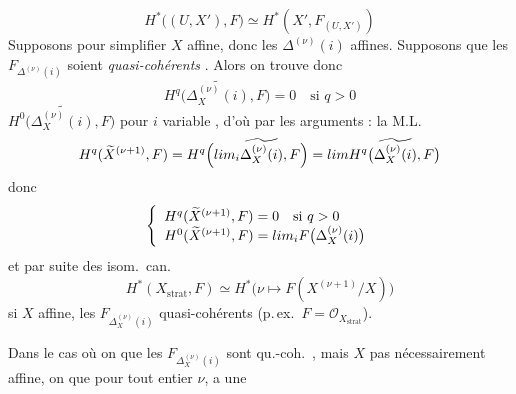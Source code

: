 \documentclass[11pt,a4paper]{article}
\begin{document}
\[
  H^{*}\bigl((U, X'), F\bigr) \simeq H^{*}(X', F_{(U, X')})
\]
Supposons pour simplifier $X$ affine,  donc
les $\Delta^{(\nu)}(i)$ affines. Supposons que les $F_{\Delta^{(\nu)}(i)}$
soient \emph{quasi-cohérents} . Alors on trouve donc
\[
  H^{q}\bigl(\widetilde{\Delta^{(\nu)}_X(i)}, F\bigr) = 0
  \quad \text{si } q > 0
\]
$H^{0}\bigl(\widetilde{\Delta^{(\nu)}_X(i)}, F\bigr)$ pour $i$ variable
, d'où par les arguments : la
M.L.
\[
  H^{q}(\widetilde{X}^{(\nu+1)}, F) =
  H^{q}\Bigl(\varinjlim_{i} \widetilde{\Delta^{(\nu)}_X(i)}, F\Bigr) =
  \varprojlim H^{q}\bigl(\widetilde{\Delta^{(\nu)}_X(i)}, F\bigr)
\]
donc
\[
  \left\lbrace
  \begin{array}{l}
    H^{q}(\widetilde{X}^{(\nu+1)}, F) = 0 \quad \text{si } q > 0 \\
    H^{0}(\widetilde{X}^{(\nu+1)}, F) = \varprojlim_{i}
    F\bigl(\Delta^{(\nu)}_X(i)\bigr)
  \end{array}
  \right.
\]
et par suite des isom.\ can.
\[
  \boxed{\;H^{*}(X_{\mathrm{strat}}, F) \simeq
  H^{*}\bigl(\nu \mapsto F(X^{(\nu+1)}/X)\bigr)\;}
\]
si $X$ affine, les $F_{\Delta^{(\nu)}_X(i)}$ quasi-cohérents
(p.\,ex.\ $F = \mathcal{O}_{X_{\mathrm{strat}}}$).

Dans le cas où on \struck{\ill{}} 
 que les $F_{\Delta^{(\nu)}_X(i)}$ sont
qu.-coh.\ ,
mais $X$ pas nécessairement affine, on  que pour
tout entier $\nu$, \ill{} a une
\end{document}

